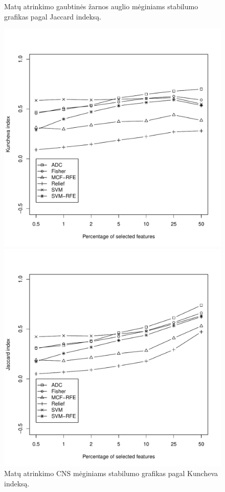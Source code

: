 \begin{figure}[H]
\begin{minipage}[b]{0.47\linewidth}
\caption{Matų atrinkimo gaubtinės žarnos auglio mėginiams stabilumo grafikas pagal Jaccard indeksą.}
\label{fig:robj_colon}
\end{minipage}
\hspace{0.2cm}
\begin{minipage}[b]{0.47\linewidth}
\centering
\includegraphics[width=.85\textwidth]{../bachelor/images/nncns_robustness_kuncheva.pdf}
\caption{Matų atrinkimo CNS mėginiams stabilumo grafikas pagal Kuncheva indeksą.}
\label{fig:robk_cns}
\end{minipage}
\hspace{0.2cm}
\begin{minipage}[b]{0.47\linewidth}
\centering
\includegraphics[width=.85\textwidth]{../bachelor/images/nncns_robustness_jaccard.pdf}

\end{minipage}
\end{figure}
